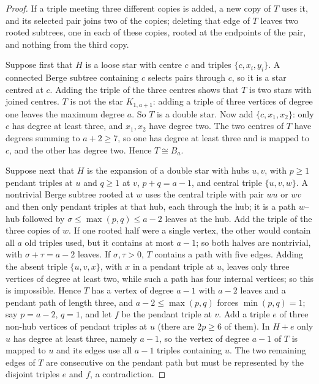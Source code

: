 \documentclass[11pt]{article}
\theoremstyle{definition}
\theoremstyle{remark}
\begin{document}
\begin{proof}
If a triple meeting three different copies is added, a new copy of $T$ uses
it, and its selected pair joins two of the copies; deleting that edge of
$T$ leaves two rooted subtrees, one in each of these copies, rooted at the
endpoints of the pair, and nothing from the third copy.

Suppose first that $H$ is a loose star with centre $c$ and triples
$\{c,x_i,y_i\}$. A connected Berge subtree containing $c$ selects pairs
through $c$, so it is a star centred at $c$. Adding the triple of the three
centres shows that $T$ is two stars with joined centres. $T$ is not the
star $K_{1,a+1}$: adding a triple of three vertices of degree one leaves
the maximum degree $a$. So $T$ is a double star. Now add $\{c,x_1,x_2\}$:
only $c$ has degree at least three, and $x_1,x_2$ have degree two. The two
centres of $T$ have degrees summing to $a+2\ge7$, so one has degree at least
three and is mapped to $c$, and the other has degree two. Hence $T\cong
B_a$.

Suppose next that $H$ is the expansion of a double star with hubs $u,v$,
with $p\ge1$ pendant triples at $u$ and $q\ge1$ at $v$, $p+q=a-1$, and
central triple $\{u,v,w\}$. A nontrivial Berge subtree rooted at $w$ uses
the central triple with pair $wu$ or $wv$ and then only pendant triples at
that hub, each through the hub; it is a path $w$--hub followed by
$\sigma\le\max(p,q)\le a-2$ leaves at the hub. Add the triple of the three
copies of $w$. If one rooted half were a single vertex, the other would
contain all $a$ old triples used, but it contains at most $a-1$; so both
halves are nontrivial, with $\sigma+\tau=a-2$ leaves. If $\sigma,\tau>0$,
$T$ contains a path with five edges. Adding the absent triple $\{u,v,x\}$,
with $x$ in a pendant triple at $u$, leaves only three vertices of degree at
least two, while such a path has four internal vertices; so this is
impossible. Hence $T$ has a vertex of degree $a-1$ with $a-2$ leaves and a
pendant path of length three, and $a-2\le\max(p,q)$ forces $\min(p,q)=1$;
say $p=a-2$, $q=1$, and let $f$ be the pendant triple at $v$. Add a triple
$e$ of three non-hub vertices of pendant triples at $u$ (there are $2p\ge6$
of them). In $H+e$ only $u$ has degree at least three, namely $a-1$, so the
vertex of degree $a-1$ of $T$ is mapped to $u$ and its edges use all $a-1$
triples containing $u$. The two remaining edges of $T$ are consecutive on
the pendant path but must be represented by the disjoint triples $e$ and
$f$, a contradiction.
\end{proof}
\end{document}
